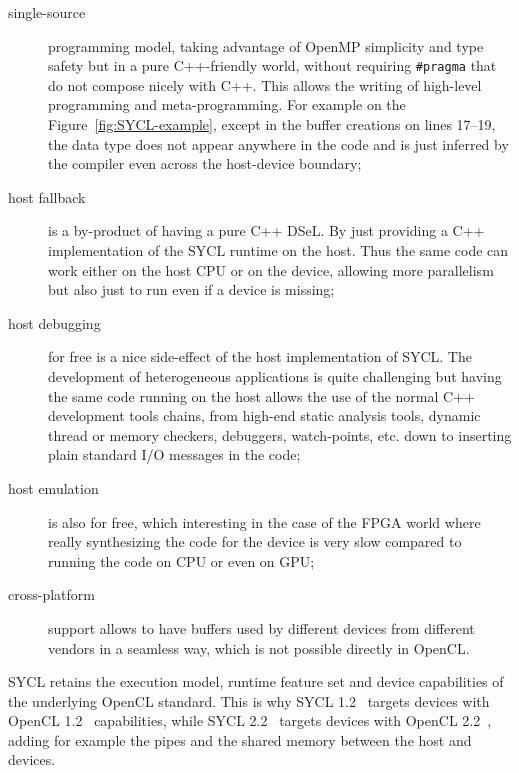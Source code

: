 \documentclass[sigplan, review]{acmart}
\begin{document}
\begin{description}
\item[single-source] programming model, taking advantage of OpenMP
  simplicity and type safety but in a pure C++-friendly world, without
  requiring \lstinline{#pragma} that do not compose nicely with
  C++. This allows the writing of high-level programming and
  meta-programming. For example on the Figure~\ref{fig:SYCL-example},
  except in the buffer creations on lines 17--19, the data type does
  not appear anywhere in the code and is just inferred by the compiler
  even across the host-device boundary;

\item[host fallback] is a by-product of having a pure C++ DSeL. By
  just providing a C++ implementation of the SYCL runtime on the
  host. Thus the same code can work either on the host CPU or on the
  device, allowing more parallelism but also just to run even if a
  device is missing;

\item[host debugging] for free is a nice side-effect of the host
  implementation of SYCL. The development of heterogeneous
  applications is quite challenging but having the same code running
  on the host allows the use of the normal C++ development tools
  chains, from high-end static analysis tools, dynamic thread or
  memory checkers, debuggers, watch-points, etc.  down to inserting
  plain standard I/O messages in the code;

\item[host emulation] is also for free, which interesting in the case
  of the FPGA world where really synthesizing the code for the device
  is very slow compared to running the code on CPU or even on GPU;

\item[cross-platform] support allows to have buffers used by different
  devices from different vendors in a seamless way, which is not
  possible directly in OpenCL.


\end{description}

SYCL retains the execution model, runtime feature set and device
capabilities of the underlying OpenCL standard. This is why SYCL
1.2~\cite{SYCL-1.2} targets devices with OpenCL
1.2~\cite{OpenCL-API+C-1.2} capabilities, while SYCL
2.2~\cite{SYCL-2.2-provisional} targets devices with OpenCL
2.2~\cite{OpenCL-API-2.2-provisional}, adding for example the pipes
and the shared memory between the host and devices.
\end{document}
